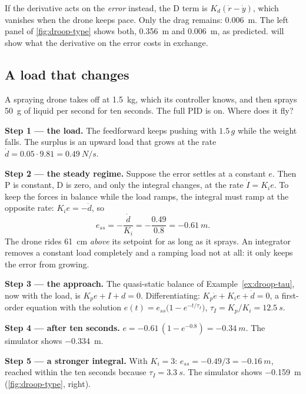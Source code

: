 If the derivative acts on the \emph{error} instead, the D term is $K_d(\dot r - \dot y)$, which vanishes when the drone keeps pace. Only the drag remains: \SI{0.006}{m}. The left panel of \cref{fig:droop-type} shows both, \SI{0.356}{m} and \SI{0.006}{m}, as predicted.  will show what the derivative on the error costs in exchange.

\subsection{A load that changes}

\begin{example}
\label{ex:droop-burn}
A spraying drone takes off at \SI{1.5}{kg}, which its controller knows, and then sprays \SI{50}{g} of liquid per second for ten seconds. The full PID is on. Where does it fly?

\textbf{Step 1 — the load.} The feedforward keeps pushing with $1.5\,g$ while the weight falls. The surplus is an upward load that grows at the rate $\dot d = 0.05 \cdot 9.81 = \SI{0.49}{N/s}$.

\textbf{Step 2 — the steady regime.} Suppose the error settles at a constant $e$. Then P is constant, D is zero, and only the integral changes, at the rate $\dot I = K_i e$. To keep the forces in balance while the load ramps, the integral must ramp at the opposite rate: $K_i e = -\dot d$, so
\begin{equation}\label{eq:droop-burn}
  e_{ss} = -\frac{\dot d}{K_i} = -\frac{0.49}{0.8} = \SI{-0.61}{m} .
\end{equation}
The drone rides \SI{61}{cm} \emph{above} its setpoint for as long as it sprays. An integrator removes a constant load completely and a ramping load not at all: it only keeps the error from growing.

\textbf{Step 3 — the approach.} The quasi-static balance of Example~\ref{ex:droop-tau}, now with the load, is $K_p e + I + d = 0$. Differentiating: $K_p\dot e + K_i e + \dot d = 0$, a first-order equation with the solution $e(t) = e_{ss}\big(1 - e^{-t/\tau_I}\big)$, $\tau_I = K_p/K_i = \SI{12.5}{s}$.

\textbf{Step 4 — after ten seconds.} $e = -0.61\,(1 - e^{-0.8}) = \SI{-0.34}{m}$. The simulator shows \SI{-0.334}{m}.

\textbf{Step 5 — a stronger integral.} With $K_i = 3$: $e_{ss} = -0.49/3 = \SI{-0.16}{m}$, reached within the ten seconds because $\tau_I = \SI{3.3}{s}$. The simulator shows \SI{-0.159}{m} (\cref{fig:droop-type}, right).
\end{example}

